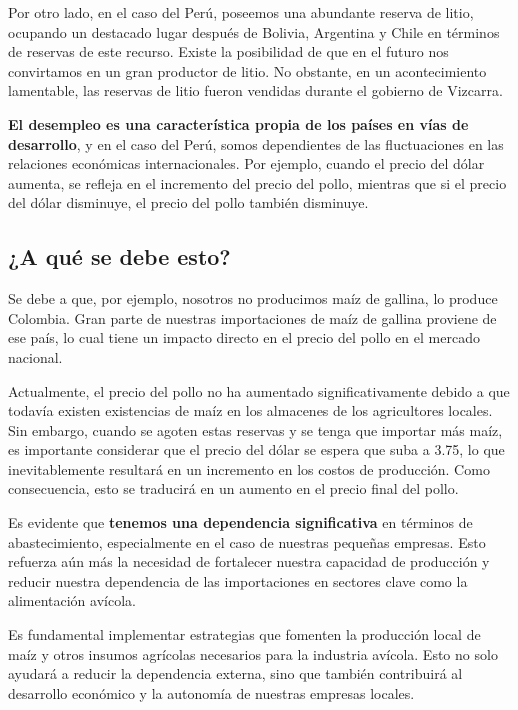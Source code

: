 \documentclass[
  a4paper,
]{article}
\begin{document}
Por otro lado, en el caso del Perú, poseemos una abundante reserva de
litio, ocupando un destacado lugar después de Bolivia, Argentina y Chile
en términos de reservas de este recurso. Existe la posibilidad de que en
el futuro nos convirtamos en un gran productor de litio. No obstante, en
un acontecimiento lamentable, las reservas de litio fueron vendidas
durante el gobierno de Vizcarra.

\textbf{El desempleo es una característica propia de los países en vías
de desarrollo}, y en el caso del Perú, somos dependientes de las
fluctuaciones en las relaciones económicas internacionales. Por ejemplo,
cuando el precio del dólar aumenta, se refleja en el incremento del
precio del pollo, mientras que si el precio del dólar disminuye, el
precio del pollo también disminuye.

\subsection{¿A qué se debe esto?}\label{a-quuxe9-se-debe-esto}

Se debe a que, por ejemplo, nosotros no producimos maíz de gallina, lo
produce Colombia. Gran parte de nuestras importaciones de maíz de
gallina proviene de ese país, lo cual tiene un impacto directo en el
precio del pollo en el mercado nacional.

Actualmente, el precio del pollo no ha aumentado significativamente
debido a que todavía existen existencias de maíz en los almacenes de los
agricultores locales. Sin embargo, cuando se agoten estas reservas y se
tenga que importar más maíz, es importante considerar que el precio del
dólar se espera que suba a 3.75, lo que inevitablemente resultará en un
incremento en los costos de producción. Como consecuencia, esto se
traducirá en un aumento en el precio final del pollo.

Es evidente que \textbf{tenemos una dependencia significativa} en
términos de abastecimiento, especialmente en el caso de nuestras
pequeñas empresas. Esto refuerza aún más la necesidad de fortalecer
nuestra capacidad de producción y reducir nuestra dependencia de las
importaciones en sectores clave como la alimentación avícola.

Es fundamental implementar estrategias que fomenten la producción local
de maíz y otros insumos agrícolas necesarios para la industria avícola.
Esto no solo ayudará a reducir la dependencia externa, sino que también
contribuirá al desarrollo económico y la autonomía de nuestras empresas
locales.
\end{document}
